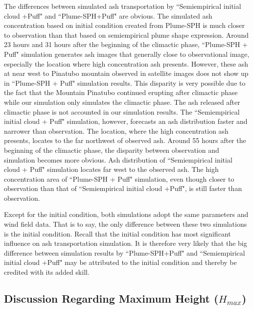 \documentclass[draft,linenumbers]{agujournal2019}
\begin{document}
The differences between simulated ash transportation by ``Semiempirical initial cloud +Puff" and ``Plume-SPH+Puff" are obvious. The simulated ash concentration based on initial condition created from Plume-SPH is much closer to observation than that based on semiempirical plume shape expression. Around 23 hours and 31 hours after the beginning of the climactic phase, ``Plume-SPH + Puff" simulation generates ash images that generally close to observational image, especially the location where high concentration ash presents. However, these ash at near west to Pinatubo mountain observed in satellite images does not show up in ``Plume-SPH + Puff" simulation results. This disparity is very possible due to the fact that the Mountain Pinatubo continued erupting after climactic phase while our simulation only simulates the climactic phase. The ash released after climactic phase is not accounted in our simulation results. The ``Semiempirical initial cloud + Puff" simulation, however, forecasts an ash distribution faster and narrower than observation. The location, where the high concentration ash presents, locates to the far northwest of observed ash. 
Around 55 hours after the beginning of the climactic phase, the disparity between observation and simulation becomes more obvious. Ash distribution of ``Semiempirical initial cloud + Puff" simulation locates far west to the observed ash. The high concentration area of ``Plume-SPH + Puff" simulation, even though closer to observation than that of ``Semiempirical initial cloud +Puff", is still faster than observation.

Except for the initial condition, both simulations adopt the same parameters and wind field data. That is to say, the only difference between these two simulations is the initial condition. Recall that the initial condition has most significant influence on ash transportation simulation. It is therefore very likely that the big difference between simulation results by ``Plume-SPH+Puff" and ``Semiempirical initial cloud +Puff" may be attributed to the initial condition and thereby be credited with its added skill.%

\subsection{Discussion Regarding Maximum Height ($H_{max}$)}
\end{document}
